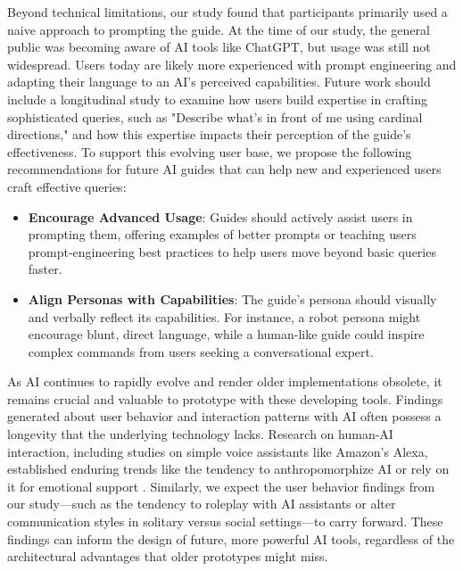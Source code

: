 Beyond technical limitations, our study found that participants primarily used a naive approach to prompting the guide. At the time of our study, the general public was becoming aware of AI tools like ChatGPT, but usage was still not widespread. Users today are likely more experienced with prompt engineering and adapting their language to an AI’s perceived capabilities. Future work should include a longitudinal study to examine how users build expertise in crafting sophisticated queries, such as "Describe what’s in front of me using cardinal directions," and how this expertise impacts their perception of the guide's effectiveness. To support this evolving user base, we propose the following recommendations for future AI guides that can help new and experienced users craft effective queries:

\begin{itemize}
\item \textbf{Encourage Advanced Usage}: Guides should actively assist users in prompting them, offering examples of better prompts or teaching users prompt-engineering best practices to help users move beyond basic queries faster.
\item \textbf{Align Personas with Capabilities}: The guide's persona should visually and verbally reflect its capabilities. For instance, a robot persona might encourage blunt, direct language, while a human-like guide could inspire complex commands from users seeking a conversational expert.
\end{itemize}

As AI continues to rapidly evolve and render older implementations obsolete, it remains crucial and valuable to prototype with these developing tools. Findings generated about user behavior and interaction patterns with AI often possess a longevity that the underlying technology lacks. Research on human-AI interaction, including studies on simple voice assistants like Amazon’s Alexa, established enduring trends like the tendency to anthropomorphize AI or rely on it for emotional support \cite{lopatovska2018, gao2018}. Similarly, we expect the user behavior findings from our study—such as the tendency to roleplay with AI assistants or alter communication styles in solitary versus social settings—to carry forward. These findings can inform the design of future, more powerful AI tools, regardless of the architectural advantages that older prototypes might miss.